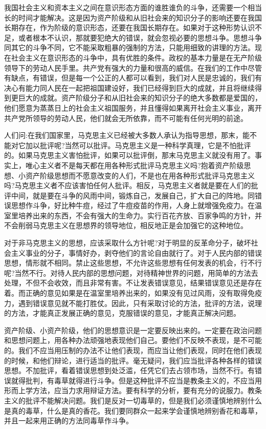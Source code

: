 \documentclass[UTF8, 12pt, a4paper]{ctexrep}
\begin{document}
我国社会主义和资本主义之间在意识形态方面的谁胜谁负的斗争，还需要一个相当长的时间才能解决。这是因为资产阶级和从旧社会来的知识分子的影响还要在我国长期存在，作为阶级的意识形态，还要在我国长期存在。如果对于这种形势认识不足，或者根本不认识，那就要犯绝大的错误，就会忽视必要的思想斗争。思想斗争同其它的斗争不同，它不能采取粗暴的强制的方法，只能用细致的讲理的方法。现在社会主义在意识形态的斗争中，具有优胜的条件。政权的基本力量是在无产阶级领导下的劳动人民手里。共产党有强大的力量和很高的威信。在我们的工作中尽管有缺点，有错误，但是每一个公正的人都可以看到，我们对人民是忠诚的，我们有决心有能力同人民在一起把祖国建设好，我们已经得到巨大的成就，并且将继续得到更巨大的成就。资产阶级分子和从旧社会来的知识分子的绝大多数都是爱国的，他们愿意为蒸蒸日上的社会主义祖国服务，并且懂得如果离开社会主义事业，离开共产党所领导的劳动人民，他们就会无所依靠，而不可能有任何光明的前途。

人们问:在我们国家里，马克思主义已经被大多数人承认为指导思想，那末，能不能对它加以批评呢?当然可以批评。马克思主义是一种科学真理，它是不怕批评的。如果马克思主义害怕批评，如果可以批评倒，那末马克思主义就没有用了。事实上，唯心主义者不是每天都在用各种形式批评马克思主义吗?抱着资产阶级思想、小资产阶级思想而不愿意改变的人们，不是也在用各种形式批评马克思主义吗?马克思主义者不应该害怕任何人批评。相反，马克思主义者就是要在人们的批评中间，就是要在斗争的风雨中间，锻炼自己，发展自己，扩大自己的阵地。同错误思想作斗争，好比种牛痘，经过了牛痘疫苗的作用，人身上就增强免疫力。在温室里培养出来的东西，不会有强大的生命力。实行百花齐放、百家争鸣的方针，并不会削弱马克思主义在思想界的领导地位，相反地正是会加强它的这种地位。

对于非马克思主义的思想，应该采取什么方针呢?对于明显的反革命分子，破坏社会主义事业的分子，事情好办，剥夺他们的言论自由就行了。对于人民内部的错误思想，情形就不相同。禁止这些思想，不允许这些思想有任何发表的机会，行不行呢?当然不行。对待人民内部的思想问题，对待精神世界的问题，用简单的方法去处理，不但不会收效，而且非常有害。不让发表错误意见，结果错误意见还是存在着。而正确的意见如果是在温室里培养出来的，如果没有见过风雨，没有取得免疫力，遇到错误意见就不能打胜仗。因此，只有采取讨论的方法，批评的方法，说理的方法，才能真正发展正确的意见，克服错误的意见，才能真正解决问题。

资产阶级、小资产阶级，他们的思想意识是一定要反映出来的。一定要在政治问题和思想问题上，用各种办法顽强地表现他们自己。要他们不反映不表现，是不可能的。我们不应当用压制的办法不让他们表现，而应当让他们表现，同时在他们表现的时候，和他们辩论，进行适当的批评。毫无疑问，我们应当批评各种各样的错误思想。不加批评，看着错误思想到处泛滥，任凭它们去占领市场，当然不行。有错误就得批判，有毒草就得进行斗争。但是这种批评不应当是教条主义的，不应当用形而上学方法，应当力求用辩证方法。要有科学的分析，要有充分的说服力。教条主义的批评不能解决问题。我们是反对一切毒草的，但是我们必须谨慎地辨别什么是真的毒草，什么是真的香花。我们要同群众一起来学会谨慎地辨别香花和毒草，并且一起来用正确的方法同毒草作斗争。
\end{document}
